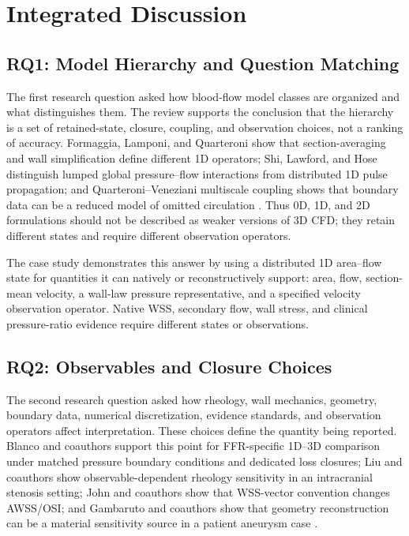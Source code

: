 \section{Integrated Discussion}
\label{sec:discussion}

\subsection{RQ1: Model Hierarchy and Question Matching}
\label{subsec:discussion-model-hierarchy-question-matching}

The first research question asked how blood-flow model classes are organized
and what distinguishes them. The review supports the conclusion that the
hierarchy is a set of retained-state, closure, coupling, and observation
choices, not a ranking of accuracy. Formaggia, Lamponi, and Quarteroni show
that section-averaging and wall simplification define different 1D operators;
Shi, Lawford, and Hose distinguish lumped global pressure--flow interactions
from distributed 1D pulse propagation; and Quarteroni--Veneziani multiscale
coupling shows that boundary data can be a reduced model of omitted circulation
\cite{FormaggiaEtAl2003OneDimensionalBloodFlow,ShiEtAl2011BloodFlowModelReview,QuarteroniVeneziani2003GeometricalMultiscale}.
Thus 0D, 1D, and 2D formulations should not be described as weaker versions of
3D CFD; they retain different states and require different observation operators.

The case study demonstrates this answer by using a distributed 1D
area--flow state for quantities it can natively or reconstructively support:
area, flow, section-mean velocity, a wall-law pressure representative, and a
specified velocity observation operator. Native WSS, secondary flow, wall
stress, and clinical pressure-ratio evidence require different states or
observations.

\subsection{RQ2: Observables and Closure Choices}
\label{subsec:discussion-closures-interpretability}

The second research question asked how rheology, wall mechanics, geometry,
boundary data, numerical discretization, evidence standards, and observation
operators affect interpretation. These choices define the quantity being
reported. Blanco and coauthors support this point for
FFR-specific 1D--3D comparison under matched pressure boundary conditions and
dedicated loss closures; Liu and coauthors show observable-dependent rheology
sensitivity in an intracranial stenosis setting; John and coauthors show that
WSS-vector convention changes AWSS/OSI; and Gambaruto and coauthors show that
geometry reconstruction can be a material sensitivity source in a patient
aneurysm case
\cite{Blanco2018FFR1D3D,LiuEtAl2021ICASRheology,JohnEtAl2017WallShearStressVectorForm,GambarutoEtAl2011GeometryRheologySensitivity}.

